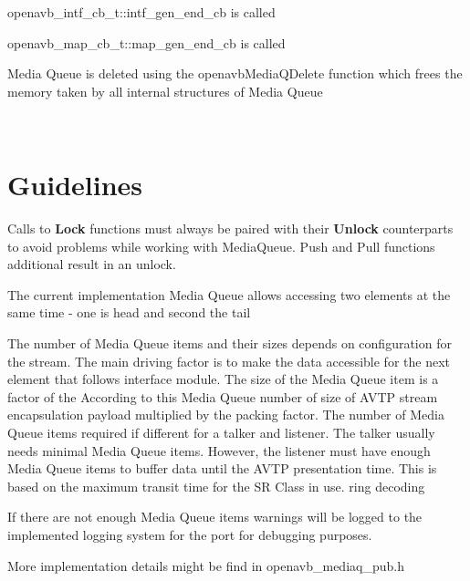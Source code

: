 \begin{DoxyItemize}
\item openavb\+\_\+intf\+\_\+cb\+\_\+t\+::intf\+\_\+gen\+\_\+end\+\_\+cb is called
\item openavb\+\_\+map\+\_\+cb\+\_\+t\+::map\+\_\+gen\+\_\+end\+\_\+cb is called
\item Media Queue is deleted using the openavb\+Media\+Q\+Delete function which frees the memory taken by all internal structures of Media Queue
\end{DoxyItemize}

~\newline
\hypertarget{sdk_notes_media_queue_usage_media_queue_usage_rules}{}\section{Guidelines    }\label{sdk_notes_media_queue_usage_media_queue_usage_rules}

\begin{DoxyItemize}
\item Calls to {\bfseries Lock} functions must always be paired with their {\bfseries Unlock} counterparts to avoid problems while working with Media\+Queue. Push and Pull functions additional result in an unlock.
\item The current implementation Media Queue allows accessing two elements at the same time -\/ one is head and second the tail
\item The number of Media Queue items and their sizes depends on configuration for the stream. The main driving factor is to make the data accessible for the next element that follows interface module. The size of the Media Queue item is a factor of the According to this Media Queue number of size of A\+V\+TP stream encapsulation payload multiplied by the packing factor. The number of Media Queue items required if different for a talker and listener. The talker usually needs minimal Media Queue items. However, the listener must have enough Media Queue items to buffer data until the A\+V\+TP presentation time. This is based on the maximum transit time for the SR Class in use. ring decoding
\item If there are not enough Media Queue items warnings will be logged to the implemented logging system for the port for debugging purposes.
\end{DoxyItemize}

More implementation details might be find in openavb\+\_\+mediaq\+\_\+pub.\+h 